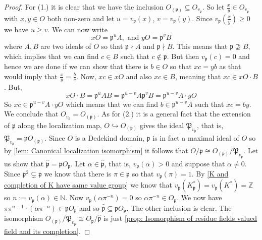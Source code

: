 \documentclass{article}
\newcommand{\mfrak}[1]{\mathfrak{#1}}
\newcommand{\mbb}[1]{\mathbb{#1}}
\newcommand{\vp}{{v_{\mfrak p}}}
\numberwithin{equation}{section}
\begin{document}
\begin{proof}
	For (1.) it is clear that we have the inclusion $O_{(\mfrak p)} \subseteq O_\vp$. So let $\frac{x}{y} \in O_\vp$ with $x,y \in O$ both non-zero and let $u = \vp(x)$, $v = \vp(y)$. Since $\vp(\frac{x}{y})  \geq 0$ we have $u \geq v$. We can now write
	$$x O = \mfrak p^u A, \text{ and } y O = \mfrak p^v B$$
	where $A,B$ are two ideals of $O$ so that $\mfrak p \nmid A$ and $\mfrak p \nmid B$. This means that $\mfrak p \nsupseteq B$, which implies that we can find $c \in B$ such that $c \notin \mfrak p$. But then $\vp(c) = 0$ and hence we are done if we can show that there is $b \in O$ so that $xc = yb$ as that would imply that $\frac{x}{y} = \frac{b}{c}$. Now, $xc \in x O$ and also $xc \in B$, meaning that $xc \in x O \cdot B$. But,
	$$x O \cdot B = \mfrak p^u A B = \mfrak p^{u-v} A \mfrak p^v B = \mfrak p^{u-v} A \cdot y O$$
	So $xc \in \mfrak p^{u-v} A \cdot y O$ which means that we can find $b \in \mfrak p^{u-v} A$ such that $xc = by$. We conclude that $O_\vp = O_{(\mfrak p)}$.
	As for (2.) it is a general fact that the extension of $\mfrak p$ along the localization map,
	$O \hookrightarrow O_{(\mfrak p)}$
	gives the ideal $\mfrak P_{\vp}$, that is, $\mfrak P_{\vp} = \mfrak p O_{(\mfrak p)}$. Since $O$ is a Dedekind domain, $\mfrak p$ is in fact a maximal ideal of $O$ so by \cref{lem: Canonical localization isomorphism} it follows that $O / \mfrak p \cong O_{(\mfrak p)} / \mfrak P_\vp$. Let us show that $\hat {\mfrak p} = \mfrak p O_\mfrak p$. Let $\alpha \in \hat {\mfrak p}$, that is, $\vp(\alpha) > 0$ and suppose that $\alpha \neq 0$. Since $\mfrak p^2 \subsetneq \mfrak p$ we know that there is $\pi \in \mfrak p$ so that $\vp(\pi) = 1$. By \cref{K and completion of K have same value group} we know that $\vp(K_\mfrak p^*) = \vp(K^*) = \mbb Z$ so $n := \vp(\alpha) \in \mbb N$. Now $\vp(\alpha \pi^{-n}) = 0$ so $\alpha \pi^{-n} \in O_\mfrak p$. We now have $\pi \pi^{n-1} \cdot (\alpha \pi^{-n}) \in \mfrak p O_\mfrak p$ and so $\hat {\mfrak p} \subseteq \mfrak p O_\mfrak p$. The other inclusion is clear. The isomorphism $O_{(\mfrak{p})} / \mfrak{P}_{v_{\mfrak{p}}} \cong O_{\mfrak{p}} / \hat{\mfrak{p}}$ is just \cref{prop: Isomorphism of residue fields valued field and its completion}.
\end{proof}
\end{document}
